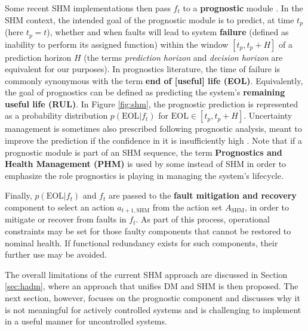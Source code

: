 Some recent SHM implementations then pass $f_t$ to a \textbf{prognostic} module \cite{Roychoudhury2011}. In the SHM context, the intended goal of the prognostic module is to predict, at time $t_p$ (here $t_p=t$), whether and when faults will lead to system \textbf{failure} (defined as inability to perform its assigned function) within the window $[t_p,t_p+H]$ of a prediction horizon $H$ (the terms \textit{prediction horizon} and \textit{decision horizon} are equivalent for our purposes). In prognostics literature, the time of failure is commonly synonymous with the term \textbf{end of [useful] life (EOL)}. Equivalently, the goal of prognostics can be defined as predicting the system's \textbf{remaining useful life (RUL)}. In Figure \ref{fig:shm}, the prognostic prediction is represented  as a probability distribution $p(\text{EOL}|f_t)$ for $\text{EOL} \in [t_p,t_p+H]$. Uncertainty management is sometimes also prescribed following prognostic analysis, meant to improve the prediction if the confidence in it is insufficiently high \cite{Wang2012}. Note that if a prognostic module is part of an SHM sequence, the term \textbf{Prognostics and Health Management (PHM)} is used by some instead of SHM in order to emphasize the role prognostics is playing in managing the system's lifecycle.

Finally, $p(\text{EOL}|f_t)$ and $f_t$ are passed to the \textbf{fault mitigation and recovery} component to select an action $a_{t+1,\text{SHM}}$ from the action set $A_{\text{SHM}}$, in order to mitigate or recover from faults in $f_t$. As part of this process, operational constraints may be set for those faulty components that cannot be restored to nominal health. If functional redundancy exists for such components, their further use may be avoided.

The overall limitations of the current SHM approach are discussed in Section \ref{sec:hadm}, where an approach that unifies DM and SHM is then proposed. The next section, however, focuses on the prognostic component and discusses why it is not meaningful for actively controlled systems and is challenging to implement in a useful manner for uncontrolled systems.

 




